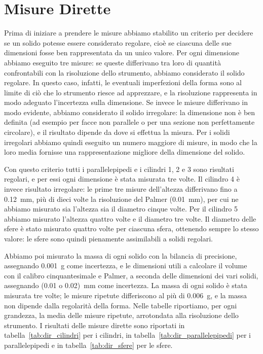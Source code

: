 \documentclass[a4paper]{article}
\begin{document}
\section{Misure Dirette}

Prima di iniziare a prendere le misure abbiamo stabilito un criterio per decidere se un solido potesse essere considerato regolare, cio\`e se ciascuna delle sue dimensioni fosse ben rappresentata da un unico valore.
Per ogni dimensione abbiamo eseguito tre misure: se queste differivano tra loro di quantit\`a confrontabili con la risoluzione dello strumento, abbiamo considerato il solido regolare.
In questo caso, infatti, le eventuali imperfezioni della forma sono al limite di ci\`o che lo strumento riesce ad apprezzare, e la risoluzione rappresenta in modo adeguato l'incertezza sulla dimensione.
Se invece le misure differivano in modo evidente, abbiamo considerato il solido irregolare: la dimensione non \`e ben definita (ad esempio per facce non parallele o per una sezione non perfettamente circolare), e il risultato dipende da dove si effettua la misura.
Per i solidi irregolari abbiamo quindi eseguito un numero maggiore di misure, in modo che la loro media fornisse una rappresentazione migliore della dimensione del solido.

Con questo criterio tutti i parallelepipedi e i cilindri 1, 2 e 3 sono risultati regolari, e per essi ogni dimensione \`e stata misurata tre volte.
Il cilindro 4 \`e invece risultato irregolare: le prime tre misure dell'altezza differivano fino a 0.12~mm, pi\`u di dieci volte la risoluzione del Palmer (0.01~mm), per cui ne abbiamo misurato sia l'altezza sia il diametro cinque volte.
Per il cilindro 5 abbiamo misurato l'altezza quattro volte e il diametro tre volte.
Il diametro delle sfere \`e stato misurato quattro volte per ciascuna sfera, ottenendo sempre lo stesso valore: le sfere sono quindi pienamente assimilabili a solidi regolari.

Abbiamo poi misurato la massa di ogni solido con la bilancia di precisione, assegnando 0.001~g come incertezza,
e le dimensioni utili a calcolare il volume con il calibro cinquantesimale e Palmer, a seconda delle dimensioni dei vari solidi, assegnando (0.01 o 0.02)~mm come incertezza.
La massa di ogni solido \`e stata misurata tre volte; le misure ripetute differiscono al pi\`u di 0.006~g, e la massa non dipende dalla regolarit\`a della forma.
Nelle tabelle riportiamo, per ogni grandezza, la media delle misure ripetute, arrotondata alla risoluzione dello strumento.
I risultati delle misure dirette sono riportati in tabella~\ref{tab:dir_cilindri} per i cilindri, in tabella~\ref{tab:dir_parallelepipedi} per i parallelepipedi e in tabella~\ref{tab:dir_sfere} per le sfere.
\end{document}
